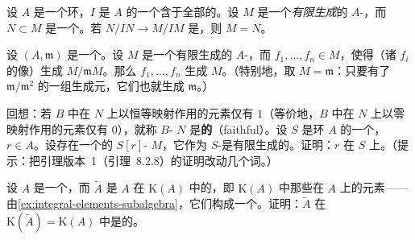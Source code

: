 \begin{exercise}\label{ex:nakayama-version-3}
设 $A$ 是一个环，$I$ 是 $A$ 的一个含于全部\trMaximalIdeal{}的\trIdeal。设 $M$ 是一个\emph{有限生成}的 $A$-\trModule，而 $N\subset M$ 是一个\trSubmodule。若 $N/IN\to M/IM$ 是\trSurjectiveMap，则 $M=N$。
\end{exercise}

\begin{exercise}\label{ex:nakayama-version-4}
设 $(A,\mathfrak{m})$ 是一个\trLocalRing。设 $M$ 是一个有限生成的 $A$-\trModule，而 $f_1,\dots,f_n\in M$，使得（诸 $f_i$ 的像）生成 $M/\mathfrak{m}M$。那么 $f_1,\dots,f_n$ 生成 $M$。（特别地，取 $M=\mathfrak{m}$：只要有了 $\mathfrak{m}/\mathfrak{m}^2$ 的一组生成元，它们也就生成 $\mathfrak{m}$。）
\end{exercise}

\begin{exercise}\label{ex:integrality-faithful-module}
回想：若 $B$ 中在 $N$ 上以恒等映射作用的元素仅有 $1$（等价地，$B$ 中在 $N$ 上以零映射作用的元素仅有 $0$），就称 $B$-\trModule{} $N$ 是\textbf{\trFaithful{}的}（faithful）。设 $S$ 是环 $A$ 的一个\trSubring，$r\in A$。设存在一个\trFaithful{}的 $S[r]$-\trModule{} $M$，它作为 $S$-\trModule{}是有限生成的。证明：$r$ 在 $S$ 上\trIntegral。（提示：把\trNakayama{}引理版本~1（引理~8.2.8）的证明改动几个词。）
\end{exercise}

\begin{exercise}\label{ex:integral-closure-integrally-closed}
设 $A$ 是一个\trIntegralDomain，而 $\widetilde{A}$ 是 $A$ 在 $\mathrm{K}(A)$ 中的\textbf{\trIntegralClosure}，即 $\mathrm{K}(A)$ 中那些在 $A$ 上\trIntegral{}的元素——由\cref{ex:integral-elements-subalgebra}，它们构成一个\trSubalgebra{}。证明：$\widetilde{A}$ 在 $\mathrm{K}(\widetilde{A})=\mathrm{K}(A)$ 中是\trIntegrallyClosed{}的。
\end{exercise}
